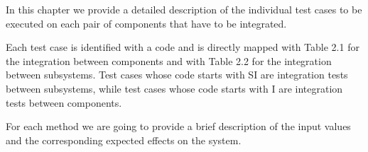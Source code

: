 In this chapter we provide a detailed description of the individual test cases to be executed on each pair of components that have to be integrated.

Each test case is identified with a code and is directly mapped with Table 2.1 for the integration between components and with Table 2.2 for the integration between subsystems.
Test cases whose code starts with SI are integration tests between subsystems, while test cases whose code starts with I are integration tests between components.

For each method we are going to provide a brief description of the input values and the corresponding expected effects on the system.
